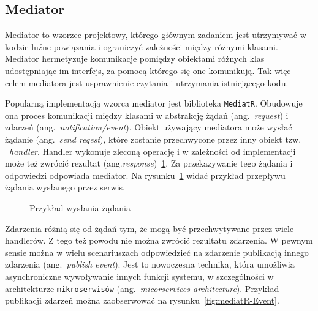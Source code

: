 \subsection{Mediator}
\label{subsec:mediator}

Mediator to wzorzec projektowy, którego głównym zadaniem jest utrzymywać w kodzie luźne powiązania i ograniczyć zależności między różnymi klasami. Mediator hermetyzuje komunikacje pomiędzy obiektami różnych klas udostępniając im interfejs, za pomocą którego się one komunikują. Tak więc celem mediatora jest usprawnienie czytania i utrzymania istniejącego kodu.

Popularną implementacją wzorca mediator jest biblioteka \texttt{MediatR}. Obudowuje ona proces komunikacji między klasami w abstrakcję żądań (ang.~\emph{request}) i zdarzeń (ang.~\emph{notification/event}). Obiekt używający mediatora może wysłać żądanie (ang.~\emph{send reqest}), które zostanie przechwycone przez inny obiekt tzw. ~\emph{handler}. Handler wykonuje zleconą operację i w zależności od implementacji może też zwrócić rezultat (ang.\emph{response})~\ref{fig:mediatR-Request}. Za przekazywanie tego żądania i odpowiedzi odpowiada mediator. Na rysunku~\ref{fig:mediatR-Request} widać przykład przepływu żądania wysłanego przez serwis.

\begin{figure}
	\centering
	\caption{Przykład wysłania żądania}
	\label{fig:mediatR-Request}
\end{figure}

Zdarzenia różnią się od żądań tym, że mogą być przechwytywane przez wiele handlerów. Z tego też powodu nie można zwrócić rezultatu zdarzenia. W pewnym sensie można w wielu scenariuszach odpowiedzieć na zdarzenie publikacją innego zdarzenia (ang.~\emph{publish event}). Jest to nowoczesna technika, która umożliwia asynchroniczne wywoływanie innych funkcji systemu, w szczególności w architekturze \texttt{mikroserwisów} (ang.~\emph{micorservices architecture}). Przykład publikacji zdarzeń można zaobserwować na rysunku~\ref{fig:mediatR-Event}.

